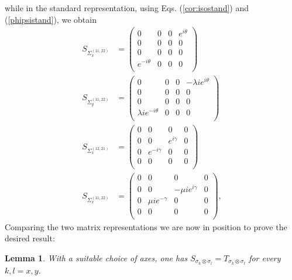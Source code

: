 \documentclass[12pt,aps,pra,showpacs,groupedaddress]{revtex4-1}
\newtheorem{lemma}{Lemma} \newtheorem{proposition}{Proposition}
\begin{document}
while in the standard representation, using Eqs. (\ref{cor:isostand})  and (\ref{phipsistand}),  we obtain  
\begin{align*}
S_{\Sigma_{x}^{(11,22)}} & =\begin{pmatrix}
      0&0&0&e^{i\theta}\\
      0&0& 0&0\\
      0&  0& 0&0\\
      e^{-i \theta}&0&0&0\\
    \end{pmatrix}\\
S_{\Sigma_{y}^{(11,22)}} & =\begin{pmatrix}
      0&0&0&-\lambda i e^{i \theta} \\
      0&0& 0&0\\
      0&  0& 0&0\\
      \lambda i e^{-i \theta}&0&0&0\\
    \end{pmatrix}\\
S_{\Sigma_{x}^{(12,21)}} &=\begin{pmatrix}
      0&0&0&0\\
      0&0& e^{i \gamma}&0\\
      0& e^{-i \gamma}& 0&0\\
      0&0&0&0\\
    \end{pmatrix}\\
S_{\Sigma_{x}^{(11,22)}} &=\begin{pmatrix}
      0&0&0&0\\
      0&0& -\mu i e^{i\gamma}&0\\
      0& \mu i e^{-\gamma}& 0&0\\
      0&0&0&0\\
    \end{pmatrix},
\end{align*}
Comparing the two matrix representations we are now in position to prove the desired result:
\begin{lemma}\label{lem:almostalmost} 
  With a suitable choice of axes, one has $S_{\sigma_k \otimes \sigma_l} = T_{\sigma_k \otimes
    \sigma_l}$ for every $k,l = x,y$.
\end{lemma}
\end{document}
